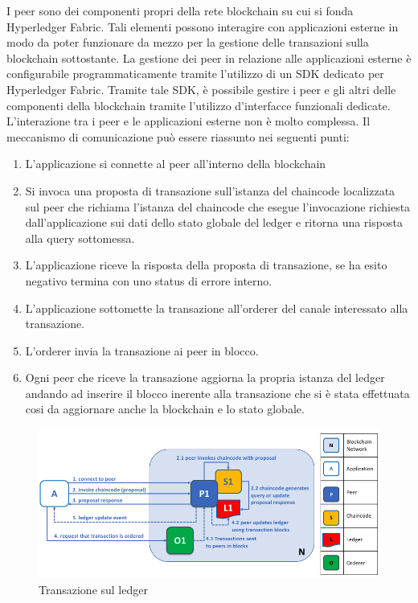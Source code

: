 I peer sono dei componenti propri della rete blockchain su cui si fonda Hyperledger Fabric. Tali elementi possono interagire con applicazioni esterne in modo da poter funzionare da mezzo per la gestione delle transazioni sulla blockchain sottostante. La gestione dei peer in relazione alle applicazioni esterne è configurabile programmaticamente tramite l'utilizzo di un SDK dedicato per Hyperledger Fabric. Tramite tale SDK, è possibile gestire i peer e gli altri delle componenti della blockchain tramite l'utilizzo d'interfacce funzionali dedicate. L'interazione tra i peer e le applicazioni esterne non è molto complessa. Il meccanismo di comunicazione può essere riassunto nei seguenti punti:
\begin{enumerate}
    \item L'applicazione si connette al peer all'interno della blockchain
    \item Si invoca una proposta di transazione sull'istanza del chaincode localizzata sul peer che richiama l'istanza del chaincode che esegue l'invocazione richiesta dall'applicazione sui dati dello stato globale del ledger e ritorna una risposta alla query sottomessa. 
    \item L'applicazione riceve la risposta della proposta di transazione, se ha esito negativo termina con uno status di errore interno.
    \item L'applicazione sottomette la transazione all'orderer del canale interessato alla transazione.
    \item L'orderer invia la transazione ai peer in blocco. 
    \item Ogni peer che riceve la transazione aggiorna la propria istanza del ledger andando ad inserire il blocco inerente alla transazione che si è stata effettuata cosi da aggiornare anche la blockchain e lo stato globale. 
\end{enumerate}
\begin{figure}[h]
    \centering
    \includegraphics[width=1\textwidth]{img/peer-transaction.png}
    \caption{Transazione sul ledger}
    \label{fig:peer-transaction-process}
\end{figure}
